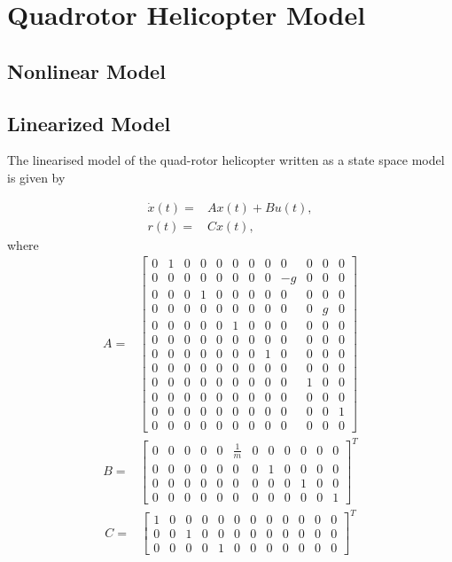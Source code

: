 \chapter{Quadrotor Helicopter Model \label{ch:model}}

\section{Nonlinear Model}

\section{Linearized Model}
\setcounter{MaxMatrixCols}{20}

The linearised model of the quad-rotor helicopter written as a state space model is given by

\begin{align*}
\dot{x}(t)= & Ax(t)+Bu(t),\\
r(t)= & Cx(t),
\end{align*}
where
\begin{align*}
A  = & 
\begin{bmatrix}
0 & 1 & 0 & 0 & 0 & 0 & 0 & 0 & 0 & 0 & 0 & 0\\
0 & 0 & 0 & 0 & 0 & 0 & 0 & 0 & -g & 0 & 0 & 0\\
0 & 0 & 0 & 1 & 0 & 0 & 0 & 0 & 0 & 0 & 0 & 0\\
0 & 0 & 0 & 0 & 0 & 0 & 0 & 0 & 0 & 0 & g & 0\\
0 & 0 & 0 & 0 & 0 & 1 & 0 & 0 & 0 & 0 & 0 & 0\\
0 & 0 & 0 & 0 & 0 & 0 & 0 & 0 & 0 & 0 & 0 & 0\\
0 & 0 & 0 & 0 & 0 & 0 & 0 & 1 & 0 & 0 & 0 & 0\\
0 & 0 & 0 & 0 & 0 & 0 & 0 & 0 & 0 & 0 & 0 & 0\\
0 & 0 & 0 & 0 & 0 & 0 & 0 & 0 & 0 & 1 & 0 & 0\\
0 & 0 & 0 & 0 & 0 & 0 & 0 & 0 & 0 & 0 & 0 & 0\\
0 & 0 & 0 & 0 & 0 & 0 & 0 & 0 & 0 & 0 & 0 & 1\\
0 & 0 & 0 & 0 & 0 & 0 & 0 & 0 & 0 & 0 & 0 & 0
\end{bmatrix}
\end{align*}
\begin{align*}
B = & 
\begin{bmatrix}
0 & 0 & 0 & 0 & 0 & \frac{1}{m} & 0 & 0 & 0 & 0 & 0 & 0\\
0 & 0 & 0 & 0 & 0 & 0 & 0 & 1 & 0 & 0 & 0 & 0\\
0 & 0 & 0 & 0 & 0 & 0 & 0 & 0 & 0 & 1 & 0 & 0\\
0 & 0 & 0 & 0 & 0 & 0 & 0 & 0 & 0 & 0 & 0 & 1
\end{bmatrix}^T
\end{align*}
%
\begin{align*}
C  = & 
\begin{bmatrix}
1 & 0 & 0 & 0 & 0 & 0 & 0 & 0 & 0 & 0 & 0 & 0\\
0 & 0 & 1 & 0 & 0 & 0 & 0 & 0 & 0 & 0 & 0 & 0\\
0 & 0 & 0 & 0 & 1 & 0 & 0 & 0 & 0 & 0 & 0 & 0
\end{bmatrix}^T
\end{align*}

